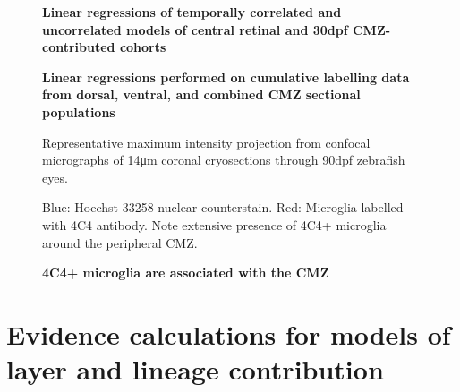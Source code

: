\begin{figure}[!h]
    \caption{{\bf Linear regressions of temporally correlated and uncorrelated models of central retinal and 30dpf CMZ-contributed cohorts}}
    \label{a27linreg}
\end{figure}


\begin{figure}[!h]
    \caption{{\bf Linear regressions performed on cumulative labelling data from dorsal, ventral, and combined CMZ sectional populations}}
    \label{cumEdUlinreg}
\end{figure}

\begin{figure}[!h]
    \caption{{\bf 4C4+ microglia are associated with the CMZ}}
    Representative maximum intensity projection from confocal micrographs of 14\si{\micro\metre} coronal cryosections through 90dpf zebrafish eyes.
    
    Blue: Hoechst 33258 nuclear counterstain. Red: Microglia labelled with 4C4 antibody. Note extensive presence of 4C4+ microglia around the peripheral CMZ.
    \label{4C4micrograph}
\end{figure}

\FloatBarrier

\section{Evidence calculations for models of layer and lineage contribution}
\FloatBarrier


